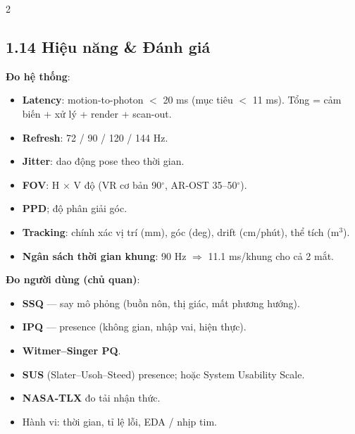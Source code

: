 \begin{paracol}{2}
\subsection*{1.14 Hiệu năng \& Đánh giá}
\textbf{Đo hệ thống}:
\begin{itemize}[leftmargin=*,nosep]
  \item \textbf{Latency}: motion-to-photon $<$ 20 ms (mục tiêu $<$ 11 ms). Tổng = cảm biến + xử lý + render + scan-out.
  \item \textbf{Refresh}: 72 / 90 / 120 / 144 Hz.
  \item \textbf{Jitter}: dao động pose theo thời gian.
  \item \textbf{FOV}: H $\times$ V độ (VR cơ bản 90$^\circ$, AR-OST 35–50$^\circ$).
  \item \textbf{PPD}; độ phân giải góc.
  \item \textbf{Tracking}: chính xác vị trí (mm), góc (deg), drift (cm/phút), thể tích (m$^3$).
  \item \textbf{Ngân sách thời gian khung}: 90 Hz $\Rightarrow$ 11.1 ms/khung cho cả 2 mắt.
\end{itemize}
\textbf{Đo người dùng (chủ quan)}:
\begin{itemize}[leftmargin=*,nosep]
  \item \textbf{SSQ} — say mô phỏng (buồn nôn, thị giác, mất phương hướng).
  \item \textbf{IPQ} — presence (không gian, nhập vai, hiện thực).
  \item \textbf{Witmer–Singer PQ}.
  \item \textbf{SUS} (Slater–Usoh–Steed) presence; hoặc System Usability Scale.
  \item \textbf{NASA-TLX} đo tải nhận thức.
  \item Hành vi: thời gian, tỉ lệ lỗi, EDA / nhịp tim.
\end{itemize}

\switchcolumn*


\end{paracol}
